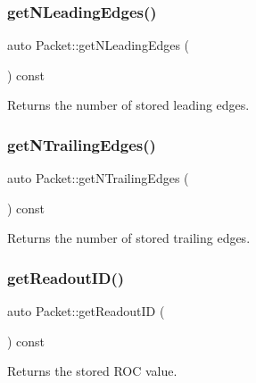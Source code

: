 \subsubsection{\texorpdfstring{get\+N\+Leading\+Edges()}{getNLeadingEdges()}}
{\footnotesize\ttfamily auto Packet\+::get\+N\+Leading\+Edges (\begin{DoxyParamCaption}{ }\end{DoxyParamCaption}) const\hspace{0.3cm}{\ttfamily [inline]}}



Returns the number of stored leading edges. 

\mbox{\label{class_packet_a1ce4adb18fcde1e39a87c9e8dc8bd985}} 
\subsubsection{\texorpdfstring{get\+N\+Trailing\+Edges()}{getNTrailingEdges()}}
{\footnotesize\ttfamily auto Packet\+::get\+N\+Trailing\+Edges (\begin{DoxyParamCaption}{ }\end{DoxyParamCaption}) const\hspace{0.3cm}{\ttfamily [inline]}}



Returns the number of stored trailing edges. 

\mbox{\label{class_packet_aa85259ee82ec6bac764124ae95527130}} 
\subsubsection{\texorpdfstring{get\+Readout\+I\+D()}{getReadoutID()}}
{\footnotesize\ttfamily auto Packet\+::get\+Readout\+ID (\begin{DoxyParamCaption}{ }\end{DoxyParamCaption}) const\hspace{0.3cm}{\ttfamily [inline]}}



Returns the stored R\+OC value. 

\mbox{\label{class_packet_a15c830a0403ef522d1ac240714a22544}} 

